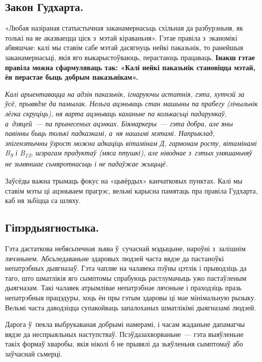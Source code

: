 \subsection*{Закон Гудхарта.}

«Любая назіраная статыстычная заканамернасьць схільная да разбурэньня, як толькі на яе аказваецца ціск з~мэтай кіраваньня». Гэтае правіла з~эканомікі абвяшчае: калі мы ставім сабе мэтай дасягнуць нейкі паказьнік, то ранейшыя заканамернасьці, якія яго выкарыстоўваюць, перастаюць працаваць. \textbf{Інакш гэтае правіла можна сфармуляваць так: «Калі нейкі паказьнік становіцца мэтай, ён перастае быць добрым паказьнікам».}

\emph{Калі арыентавацца на адзін паказьнік, ігнаруючы астатнія, гэта, хутчэй за ўсё, прывядзе да памылак. Нельга ацэньваць стан машыны па прабегу (лічыльнік лёгка скруціць), ня варта ацэньваць каханьне па колькасьці падарункаў, а~дзяцей~--- па прынесеных ацэнках. Біямаркеры~--- гэта добра, але яны павінны быць толькі падказкамі, а~ня нашымі мэтамі. Напрыклад, эпігенэтычны ўзрост можна адкаціць вітамінам Д, гармонам росту, вітамінамі B\textsubscript{9} і B\textsubscript{12}, шэрагам прадуктаў (мяса птушкі), але ніводнае з~гэтых умяшаньняў не зьмяншае сьмяротнасьць і не падаўжае жыцьцё.}

Заўсёды важна трымаць фокус на «цьвёрдых» канчатковых пунктах. Калі мы ставім мэты ці ацэньваем прагрэс, вельмі карысна памятаць пра правіла Гудхарта, каб ня зьбіцца са шляху.

\subsection*{Гіпэрдыягностыка.}

Гэта дастаткова небясьпечная зьява ў~сучаснай мэдыцыне, нароўні з~залішнім лячэньнем. Абсьледаваньне здаровых людзей часта вядзе да пастаноўкі непатрэбных дыягназаў. Гэта чапляе на чалавека пэўны цэтлік і прыводзіць да таго, што шматлікія яго сымптомы спрабуюць растлумачыць ужо пастаўленым дыягназам. Такі чалавек атрымлівае непатрэбнае лячэньне і праходзіць празь непатрэбныя працэдуры, хоць ён пры гэтым здаровы ці мае мінімальную рызыку. Вельмі часта даводзіцца супакойваць запалоханых шматлікімі дыягназамі людзей.

Дарога ў~пекла выбрукаваная добрымі намерамі, і часам жаданьне дапамагчы вядзе да неспрыяльных наступстваў. Псэўдазахворваньне~--- гэта выяўленьне такіх формаў хваробы, якія ніколі б не прывялі да зьяўленьня сымптомаў або заўчаснай сьмерці.

